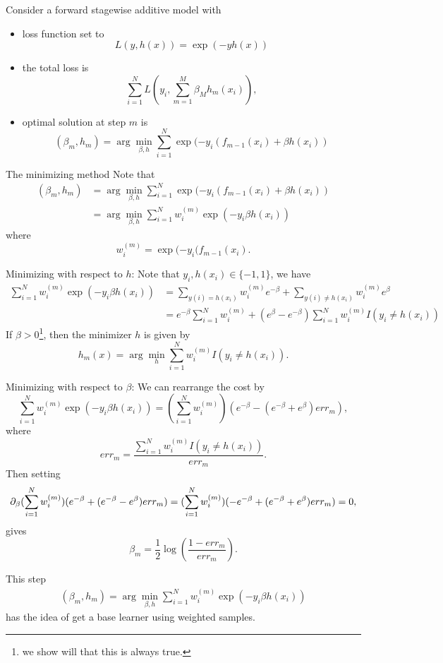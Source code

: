 \begin{refsection}
Consider a forward stagewise additive model with
\begin{itemize}
	\item loss function set to 
	$$L(y,h(x)) = \exp(-yh(x))$$
	\item the total loss is
	$$\sum_{i=1}^N L(y_i, \sum_{m=1}^M \beta_Mh_m(x_i)),$$
	\item optimal solution at step $m$ is
	$$(\beta_m,h_m) = \arg\min_{\beta,h} \sum_{i=1}^N \exp(-y_i(f_{m-1}(x_i)+\beta h(x_i))$$
\end{itemize}

The minimizing method
Note that
\begin{align*}
(\beta_m,h_m) &= \arg\min_{\beta,h} \sum_{i=1}^N \exp(-y_i(f_{m-1}(x_i)+\beta h(x_i)) \\
&= \arg\min_{\beta,h} \sum_{i=1}^N w_i^{(m)}\exp(-y_i\beta h(x_i))
\end{align*}
where 
$$w_i^{(m)} = \exp(-y_i(f_{m-1}(x_i).$$


Minimizing with respect to $h$:
Note that $y_i,h(x_i)\in\{-1,1\}$, we have
\begin{align*}
\sum_{i=1}^N w_i^{(m)}\exp(-y_i\beta h(x_i)) &= \sum_{y(i)=h(x_i)} w_i^{(m)}e^{-\beta} + \sum_{y(i)\neq h(x_i)} w_i^{(m)}e^{\beta} \\
&= e^{-\beta}\sum_{i=1}^N w_i^{(m)} + (e^\beta - e^{-\beta})\sum_{i=1}^N w_i^{(m)}I(y_i\neq h(x_i))
\end{align*}
If $\beta > 0$\footnote{we show will that this is always true.}, then the minimizer $h$ is given by
$$h_m(x) = \arg\min_{h} \sum_{i=1}^N w_i^{(m)}I(y_i\neq h(x_i)).$$

Minimizing with respect to $\beta$:
We can rearrange the cost by
$$\sum_{i=1}^N w_i^{(m)}\exp(-y_i\beta h(x_i)) = (\sum_{i=1}^N w_i^{(m)})(e^{-\beta}-(e^{-\beta}+e^\beta) err_m),$$
where
$$err_m = \frac{\sum_{i=1}^N w_i^{(m)}I(y_i\neq h(x_i))}{err_m}.$$
Then setting
$$\partial_\beta  (\sum_{i=1}^N w_i^{(m)})(e^{-\beta}+(e^{-\beta}-e^\beta) err_m) =  (\sum_{i=1}^N w_i^{(m)})(-e^{-\beta}+(e^{-\beta}+e^\beta) err_m) =0, $$
gives 
$$\beta_m = \frac{1}{2}\log(\frac{1-err_m}{err_m}).$$


\begin{remark}
This step	
\begin{align*}
(\beta_m,h_m) = \arg\min_{\beta,h} \sum_{i=1}^N w_i^{(m)}\exp(-y_i\beta h(x_i))
\end{align*}	
has the idea of get a base learner using weighted samples. 
\end{remark}



\end{refsection}
